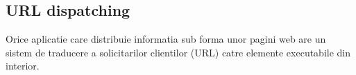 \subsection{URL dispatching}

Orice aplicatie care distribuie informatia sub forma unor pagini web are un sistem de traducere a solicitarilor clientilor (URL) catre elemente executabile din interior. 